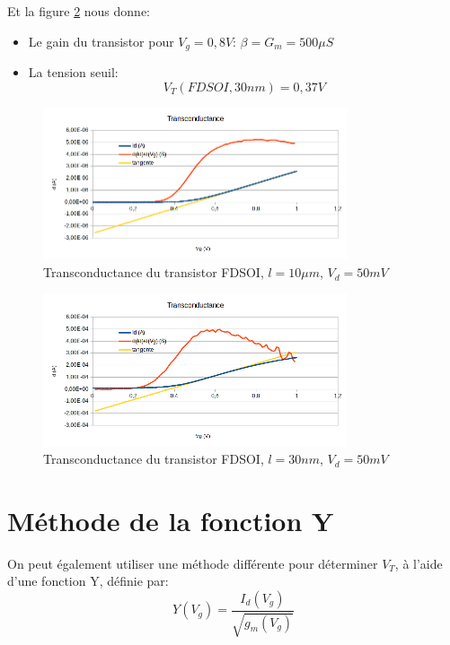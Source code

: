 \documentclass[a4paper,11pt]{report}
\begin{document}
\vspace*{8mm}
Et la figure \ref{transc_fdsoi_30nm} nous donne:
\begin{itemize}
    \item Le gain du transistor pour $V_g = 0,8V$: $\beta = G_m = 500\mu S$
    \item La tension seuil: \[V_T(FDSOI, 30nm) = 0,37V\]
\end{itemize}



\begin{figure}[h]
    \begin{center}
        \includegraphics[width=0.8\textwidth]{Images/FD1-10-Transconductance}
        \caption{Transconductance du transistor FDSOI, $l=10\mu m$, $V_d = 50mV$}
        \label{transc_fdsoi_10um}
    \end{center}
\end{figure}
\begin{figure}[h]
    \begin{center}
        \includegraphics[width=0.8\textwidth]{Images/FD11-30-Transconductance}
        \caption{Transconductance du transistor FDSOI, $l=30nm$, $V_d = 50mV$}
        \label{transc_fdsoi_30nm}
    \end{center}
\end{figure}



\section{Méthode de la fonction Y}
On peut également utiliser une méthode différente pour déterminer $V_T$, à l'aide d'une fonction Y, définie par:
\[Y(V_g)=\dfrac{I_d(V_g)}{\sqrt{g_m(V_g)}}\]
\end{document}
